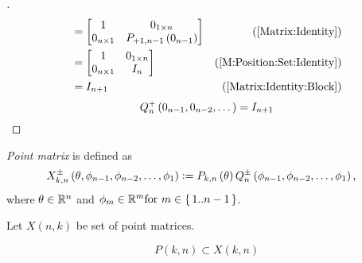 \documentclass[stu, babel, american, biblatex, a4paper, leqno, draftall]{apa7}
\begin{document}
\begin{proof}[]
\begin{align*}
                                                                                                       & =
        \begin{bmatrix}
            1             & 0_{1\times n}                  \\
            0_{n\times 1} & P_{+1,n-1}\left(0_{n-1}\right) \\
        \end{bmatrix}                                              & \text{(\cref{Matrix:Identity})}                                           \\
                                                                                                       & =
        \begin{bmatrix}
            1             & 0_{1\times n} \\
            0_{n\times 1} & I_{n}         \\
        \end{bmatrix}                                                               & \text{(\cref{M:Position:Set:Identity})}                  \\
                                                                                                       & =
        I_{n+1}                                                                                        & \text{(\cref{Matrix:Identity:Block})}
    \end{align*}
    \begin{equation*}
        Q^+_n
        \left(0_{n-1}, 0_{n-2}, \dots\right)
        =
        I_{n+1}
        \qedhere
    \end{equation*}
\end{proof}
\begin{definition}\label{M:Point}
    \textit{Point matrix} is defined as
    \begin{align*}
        X^\pm_{k,n}\left(\theta,\phi_{n-1},\phi_{n-2},\dots,\phi_1\right) & \vcentcolon=
        P_{k,n}\left(\theta\right)
        Q^\pm_n\left(\phi_{n-1},\phi_{n-2},\dots,\phi_1\right)\text{,}
    \end{align*}
    where $\theta\in\mathbb{R}^n$ and $\phi_m\in\mathbb{R}^m \text{for } m\in\set{1..n-1}$.
\end{definition}
\begin{definition}\label{M:Point:Set}
    Let $X\left(n,k\right)$ be set of point matrices.
\end{definition}
\begin{corollary}\label{M:Point:Position}
    \begin{equation*}
        P\left(k,n\right)\subset X\left(k,n\right)
    \end{equation*}
\end{corollary}
\end{document}
